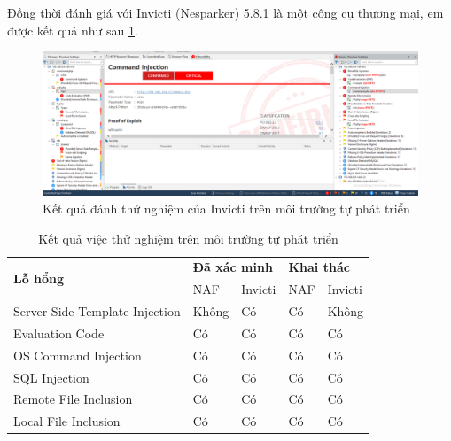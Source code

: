 \documentclass[./../main.tex]{subfiles}
\begin{document}
Đồng thời đánh giá với Invicti (Nesparker) 5.8.1 là một công cụ thương mại, em được kết quả như sau \ref{fig:np_vulns}.

\begin{figure}[h!]
	\includegraphics[width=\linewidth]{./images/np.png}
	\caption{Kết quả đánh thử nghiệm của Invicti trên môi trường tự phát triển}
	\label{fig:np_vulns}
\end{figure}


\begin{table}[ht!]
	\begin{tabular}{|l|ll|ll|}
		\hline
		\multirow{2}{*}{\textbf{Lỗ hổng}} & \multicolumn{2}{l|}{\textbf{Đã xác minh}} & \multicolumn{2}{l|}{\textbf{Khai thác}}                                      \\ \cline{2-5}
		                                  & \multicolumn{1}{l|}{NAF}                  & Invicti                                 & \multicolumn{1}{l|}{NAF} & Invicti \\ \hline
		Server Side Template Injection    & \multicolumn{1}{l|}{Không}                & Có                                      & \multicolumn{1}{l|}{Có}  & Không   \\ \hline
		Evaluation Code                   & \multicolumn{1}{l|}{Có}                   & Có                                      & \multicolumn{1}{l|}{Có}  & Có      \\ \hline
		OS Command Injection              & \multicolumn{1}{l|}{Có}                   & Có                                      & \multicolumn{1}{l|}{Có}  & Có      \\ \hline
		SQL Injection                     & \multicolumn{1}{l|}{Có}                   & Có                                      & \multicolumn{1}{l|}{Có}  & Có      \\ \hline
		Remote File Inclusion             & \multicolumn{1}{l|}{Có}                   & Có                                      & \multicolumn{1}{l|}{Có}  & Có      \\ \hline
		Local File Inclusion              & \multicolumn{1}{l|}{Có}                   & Có                                      & \multicolumn{1}{l|}{Có}  & Có      \\ \hline
	\end{tabular}
	\caption{Kết quả việc thử nghiệm trên môi trường tự phát triển}
	\label{tb:result_test}
\end{table}
\end{document}
